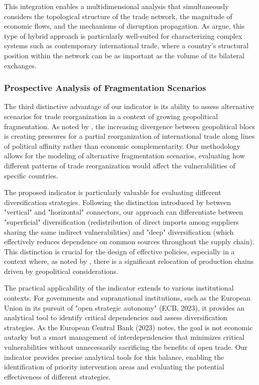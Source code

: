\documentclass[final,1p,times,authoryear]{elsarticle}
\begin{document}
This integration enables a multidimensional analysis that simultaneously considers the topological structure of the trade network, the magnitude of economic flows, and the mechanisms of disruption propagation. As \cite{Cerina2015} argue, this type of hybrid approach is particularly well-suited for characterizing complex systems such as contemporary international trade, where a country's structural position within the network can be as important as the volume of its bilateral exchanges.

\subsubsection{Prospective Analysis of Fragmentation Scenarios}

The third distinctive advantage of our indicator is its ability to assess alternative scenarios for trade reorganization in a context of growing geopolitical fragmentation. As noted by \citet{Campos2023}, the increasing divergence between geopolitical blocs is creating pressures for a partial reorganization of international trade along lines of political affinity rather than economic complementarity. Our methodology allows for the modeling of alternative fragmentation scenarios, evaluating how different patterns of trade reorganization would affect the vulnerabilities of specific countries.

The proposed indicator is particularly valuable for evaluating different diversification strategies. Following the distinction introduced by \citet{Aiyar2024} between "vertical" and "horizontal" connectors, our approach can differentiate between "superficial" diversification (redistribution of direct imports among suppliers sharing the same indirect vulnerabilities) and "deep" diversification (which effectively reduces dependence on common sources throughout the supply chain). This distinction is crucial for the design of effective policies, especially in a context where, as noted by \citet{Alfaro2023}, there is a significant relocation of production chains driven by geopolitical considerations.

The practical applicability of the indicator extends to various institutional contexts. For governments and supranational institutions, such as the European Union in its pursuit of "open strategic autonomy" (ECB, 2023), it provides an analytical tool to identify critical dependencies and assess diversification strategies. As the European Central Bank (2023) notes, the goal is not economic autarky but a smart management of interdependencies that minimizes critical vulnerabilities without unnecessarily sacrificing the benefits of open trade. Our indicator provides precise analytical tools for this balance, enabling the identification of priority intervention areas and evaluating the potential effectiveness of different strategies.
\end{document}
